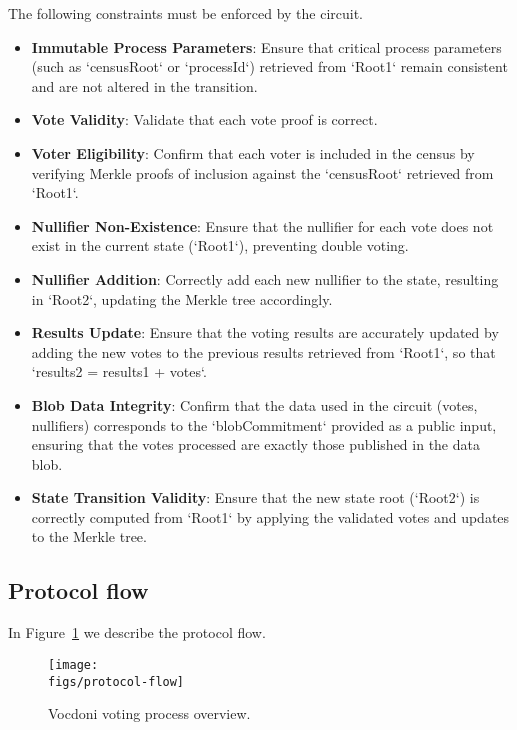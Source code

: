The following constraints must be enforced by the circuit.

\begin{itemize}
	\item \textbf{Immutable Process Parameters}: Ensure that critical process parameters (such as `censusRoot` or `processId`) retrieved from `Root1` remain consistent and are not altered in the transition.
	\item \textbf{Vote Validity}: Validate that each vote proof is correct.
	\item \textbf{Voter Eligibility}: Confirm that each voter is included in the census by verifying Merkle proofs of inclusion against the `censusRoot` retrieved from `Root1`.
	\item \textbf{Nullifier Non-Existence}: Ensure that the nullifier for each vote does not exist in the current state (`Root1`), preventing double voting.
	\item \textbf{Nullifier Addition}: Correctly add each new nullifier to the state, resulting in `Root2`, updating the Merkle tree accordingly.
	\item \textbf{Results Update}: Ensure that the voting results are accurately updated by adding the new votes to the previous results retrieved from `Root1`, so that `results2 = results1 + votes`.
	\item \textbf{Blob Data Integrity}: Confirm that the data used in the circuit (votes, nullifiers) corresponds to the `blobCommitment` provided as a public input, ensuring that the votes processed are exactly those published in the data blob.
	\item \textbf{State Transition Validity}: Ensure that the new state root (`Root2`) is correctly computed from `Root1` by applying the validated votes and updates to the Merkle tree.
\end{itemize}

\subsection{Protocol flow}
\label{sec:vocdoni-protocol:flow}

In Figure~\ref{fig:protocol-flow} we describe the protocol flow.


\begin{figure}[H]
	\centerline{\texttt{[image: \\figs/protocol-flow]}}
	\caption{Vocdoni voting process overview.}
	\label{fig:protocol-flow}
\end{figure}

